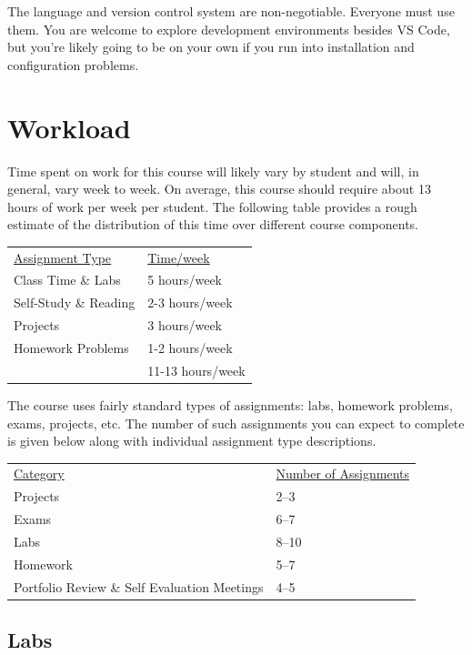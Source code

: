 \documentclass[10pt]{article}
\begin{document}
The language and version control system are non-negotiable. Everyone must use them. You are welcome to explore 
development environments besides VS Code, but you're likely going to be on your own if you run into installation 
and configuration problems. 

  
\section{Workload}


Time spent on work for this course will likely vary by student and will, in general, vary week to week. On average, this course should require about 13 hours of work per week per student.  The following table provides a rough estimate of the distribution of this time over different course components.
\begin{center}
\begin{tabular}{ll}
\underline{Assignment Type} & \underline{Time/week} \\
Class Time \& Labs       & 5 hours/week \\
Self-Study \& Reading & 2-3 hours/week \\
Projects           & 3 hours/week \\
Homework Problems   & 1-2 hours/week \\
\bottomrule
 & 11-13 hours/week
\end{tabular}
\end{center}


The course uses fairly standard types of assignments: labs, homework problems, exams, projects, etc. The number of such assignments you can expect to complete is given below along with individual assignment type descriptions.
\begin{center}
  \begin{tabular}{ll}
    \underline{Category} & \underline{Number of Assignments} \\
    Projects & 2--3 \\
    Exams & 6--7 \\    
    Labs & 8--10 \\
    Homework & 5--7 \\
    Portfolio Review \& Self Evaluation Meetings & 4--5 \\
  \end{tabular}
\end{center}

\subsection*{Labs}
\end{document}
